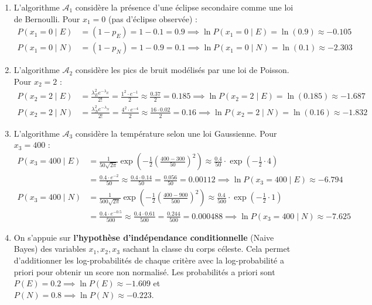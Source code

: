 \documentclass[solutions]{../exercices}
\begin{document}
\begin{solution}
	\begin{enumerate}
		\item L'algorithme $\mathcal{A}_1$ considère la présence d'une éclipse secondaire comme une loi de Bernoulli.
		Pour $x_1 = 0$ (pas d'éclipse observée) :
		\begin{align*}
			P(x_1 = 0 \mid E) &= (1 - p_E) = 1 - 0.1 = 0.9 \implies \ln P(x_1 = 0 \mid E) = \ln(0.9) \approx -0.105 \\
			P(x_1 = 0 \mid N) &= (1 - p_N) = 1 - 0.9 = 0.1 \implies \ln P(x_1 = 0 \mid N) = \ln(0.1) \approx -2.303
		\end{align*}

		\item L'algorithme $\mathcal{A}_2$ considère les pics de bruit modélisés par une loi de Poisson.
		Pour $x_2 = 2$ :
		\begin{align*}
			P(x_2 = 2 \mid E) &= \frac{\lambda_E^2 e^{-\lambda_E}}{2!} = \frac{1^2 \cdot e^{-1}}{2} \approx \frac{0.37}{2} = 0.185 \implies \ln P(x_2 = 2 \mid E) = \ln(0.185) \approx -1.687 \\
			P(x_2 = 2 \mid N) &= \frac{\lambda_N^2 e^{-\lambda_N}}{2!} = \frac{4^2 \cdot e^{-4}}{2} \approx \frac{16 \cdot 0.02}{2} = 0.16 \implies \ln P(x_2 = 2 \mid N) = \ln(0.16) \approx -1.832
		\end{align*}

		\item L'algorithme $\mathcal{A}_3$ considère la température selon une loi Gaussienne.
		Pour $x_3 = 400$ :
		\begin{align*}
			P(x_3 = 400 \mid E) &= \frac{1}{50 \sqrt{2 \pi}} \exp{\left(-\frac{1}{2} \left(\frac{400 - 300}{50}\right)^2\right)} \approx \frac{0.4}{50} \cdot \exp{\left(-\frac{1}{2} \cdot 4\right)} \\
			&= \frac{0.4 \cdot e^{-2}}{50} \approx \frac{0.4 \cdot 0.14}{50} = \frac{0.056}{50} = 0.00112 \implies \ln P(x_3 = 400 \mid E) \approx -6.794 \\
			P(x_3 = 400 \mid N) &= \frac{1}{500 \sqrt{2 \pi}} \exp{\left(-\frac{1}{2} \left(\frac{400 - 900}{500}\right)^2\right)} \approx \frac{0.4}{500} \cdot \exp{\left(-\frac{1}{2} \cdot 1\right)} \\
			&= \frac{0.4 \cdot e^{-0.5}}{500} \approx \frac{0.4 \cdot 0.61}{500} = \frac{0.244}{500} = 0.000488 \implies \ln P(x_3 = 400 \mid N) \approx -7.625
		\end{align*}

		\item On s'appuie sur \textbf{l'hypothèse d'indépendance conditionnelle} (Naive Bayes) des variables $x_1, x_2, x_3$ sachant la classe du corps céleste.
		Cela permet d'additionner les log-probabilités de chaque critère avec la log-probabilité a priori pour obtenir un score non normalisé.
		Les probabilités a priori sont $P(E) = 0.2 \implies \ln P(E) \approx -1.609$ et $P(N) = 0.8 \implies \ln P(N) \approx -0.223$.


\end{enumerate}
\end{solution}
\end{document}
